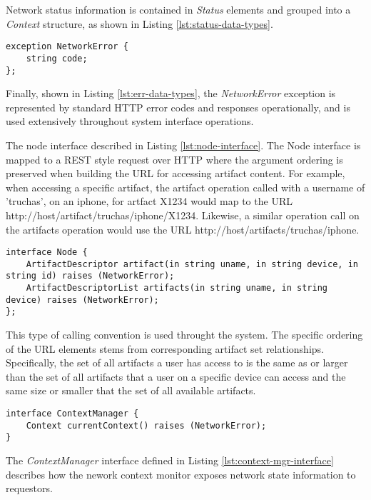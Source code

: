 Network status information is contained in \emph{Status} elements and grouped into a \emph{Context} structure, as shown in Listing \ref{lst:status-data-types}.

\begin{lstlisting}[label=lst:err-data-types, caption=Key Error Dataypes]
exception NetworkError {
	string code;
};
\end{lstlisting}

Finally, shown in Listing \ref{lst:err-data-types}, the \emph{NetworkError} exception is represented by standard HTTP error codes and responses operationally, and is used extensively throughout system interface operations.

%

The node interface described in Listing \ref{lst:node-interface}.  The Node interface is mapped to a REST style request over HTTP where the argument ordering is preserved when building the URL for accessing artifact content.  For example, when accessing a specific artifact, the artifact operation called with a username of 'truchas', on an iphone, for artfact X1234 would map to the URL http://host/artifact/truchas/iphone/X1234.  Likewise, a similar operation call on the artifacts operation would use the URL http://host/artifacts/truchas/iphone.

\begin{lstlisting}[label=lst:node-interface, caption=The Node Interface]
interface Node {
	ArtifactDescriptor artifact(in string uname, in string device, in string id) raises (NetworkError);
	ArtifactDescriptorList artifacts(in string uname, in string device) raises (NetworkError);
};
\end{lstlisting}

This type of calling convention is used throught the system.  The specific ordering of the URL elements stems from corresponding artifact set relationships.  Specifically, the set of all artifacts a user has access to is the same as or larger than the set of all artifacts that a user on a specific device can access and the same size or smaller that the set of all available artifacts.

\begin{lstlisting}[label=lst:context-mgr-interface, caption=The Context Manager  Interface]
interface ContextManager {
	Context currentContext() raises (NetworkError);
}
\end{lstlisting}

The \emph{ContextManager} interface defined in Listing \ref{lst:context-mgr-interface} describes how the nework context monitor exposes network state information to requestors.